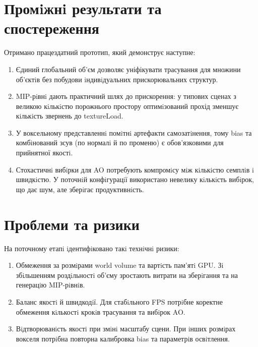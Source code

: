 \documentclass[a4paper,12pt]{article}
\begin{document}
\section*{Промiжнi результати та спостереження}
Отримано працездатний прототип, який демонструє наступне:
\begin{enumerate}
\item Єдиний глобальний об’єм дозволяє уніфікувати трасування для множини об’єктiв без побудови iндивiдуальних прискорювальних структур.
\item MIP-рiвнi дають практичний шлях до прискорення: у типових сценах з великою кiлькiстю порожнього простору оптимiзований прохід зменшує кiлькiсть звернень до textureLoad.
\item У воксельному представленнi помiтнi артефакти самозатiнення, тому bias та комбiнований зсув (по нормалi й по променю) є обов’язковими для прийнятної якостi.
\item Стохастичнi вибiрки для AO потребують компромiсу мiж кiлькiстю семплiв i швидкiстю. У поточнiй конфiгурацiї використано невелику кiлькiсть вибiрок, що дає шум, але зберiгає продуктивнiсть.
\end{enumerate}

\section*{Проблеми та ризики}
На поточному етапi iдентифiковано такi технiчнi ризики:
\begin{enumerate}
\item Обмеження за розмiрами world volume та вартiсть пам’ятi GPU. Зi збiльшенням роздiльностi об’єму зростають витрати на зберiгання та на генерацiю MIP-рiвнiв.
\item Баланс якостi й швидкодiї. Для стабiльного FPS потрiбне коректне обмеження кiлькостi крокiв трасування та вибiрок AO.
\item Вiдтворюванiсть якостi при змiнi масштабу сцени. При iнших розмiрах вокселя потрiбна повторна калибровка bias та параметрiв освiтлення.
\end{enumerate}
\end{document}
